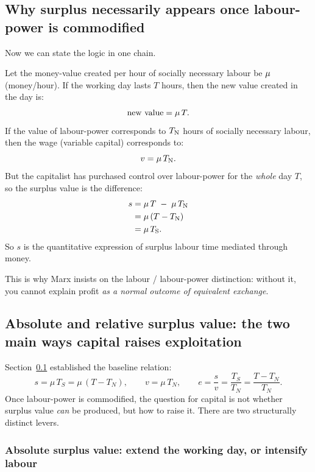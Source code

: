 \subsection{Why surplus necessarily appears once labour-power is commodified}
\label{sec:why-surplus}

Now we can state the logic in one chain.

Let the money-value created per hour of socially necessary labour be $\mu$ (money/hour).
If the working day lasts $T$ hours, then the new value created in the day is:
\[
  \text{new value} = \mu \, T.
\]
If the value of labour-power corresponds to $T_{\mathrm{N}}$ hours of socially necessary labour,
then the wage (variable capital) corresponds to:
\[
  v = \mu \, T_{\mathrm{N}}.
\]
But the capitalist has purchased control over labour-power for the \emph{whole} day $T$,
so the surplus value is the difference:
\begin{align*}
  s
  &= \mu \, T \;-\; \mu \, T_{\mathrm{N}} \\
  &= \mu \, (T - T_{\mathrm{N}}) \\
  &= \mu \, T_{\mathrm{S}}.
\end{align*}
So $s$ is the quantitative expression of surplus labour time mediated through money.

This is why Marx insists on the labour / labour-power distinction: without it, you
cannot explain profit \emph{as a normal outcome of equivalent exchange}.

\subsection{Absolute and relative surplus value: the two main ways capital raises exploitation}
\label{sec:absolute-relative-surplus}

Section~\ref{sec:why-surplus} established the baseline relation:
\[
  s = \mu\,T_S=\mu\,(T-T_N),
  \qquad
  v=\mu\,T_N,
  \qquad
  e=\frac{s}{v}=\frac{T_S}{T_N}=\frac{T-T_N}{T_N}.
\]
Once labour-power is commodified, the question for capital is not whether surplus value
\emph{can} be produced, but how to raise it. There are two structurally distinct levers.

\subsubsection*{Absolute surplus value: extend the working day, or intensify labour}

